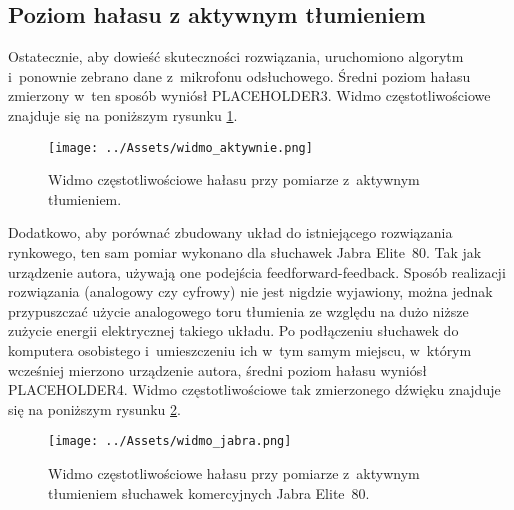 \subsection{Poziom hałasu z aktywnym tłumieniem}
Ostatecznie, aby dowieść skuteczności rozwiązania, uruchomiono algorytm i~ponownie zebrano dane z~mikrofonu odsłuchowego. Średni poziom hałasu zmierzony w~ten sposób wyniósł PLACEHOLDER3. %
Widmo częstotliwościowe znajduje się na poniższym rysunku \ref{fig:widmo_aktywnie}.
\begin{figure}[h!]
	\texttt{[image: ../Assets/widmo\_aktywnie.png]}	
	\caption{Widmo częstotliwościowe hałasu przy pomiarze z~aktywnym tłumieniem.}
	\label{fig:widmo_aktywnie}
\end{figure}

Dodatkowo, aby porównać zbudowany układ do istniejącego rozwiązania rynkowego, ten sam pomiar wykonano dla słuchawek Jabra Elite~80. Tak jak urządzenie autora, używają one podejścia feedforward-feedback.\cite{JabraEvolve80} Sposób realizacji rozwiązania (analogowy czy cyfrowy) nie jest nigdzie wyjawiony, można jednak przypuszczać użycie analogowego toru tłumienia ze względu na dużo niższe zużycie energii elektrycznej takiego układu. Po podłączeniu słuchawek do komputera osobistego i~umieszczeniu ich w~tym samym miejscu, w~którym wcześniej mierzono urządzenie autora, średni poziom hałasu wyniósł PLACEHOLDER4. Widmo częstotliwościowe tak zmierzonego dźwięku znajduje się na poniższym rysunku \ref{fig:widmo_jabra}.
\begin{figure}[h!]
	\texttt{[image: ../Assets/widmo\_jabra.png]}	
	\caption{Widmo częstotliwościowe hałasu przy pomiarze z~aktywnym tłumieniem słuchawek komercyjnych Jabra Elite~80.}
	\label{fig:widmo_jabra}
\end{figure}
